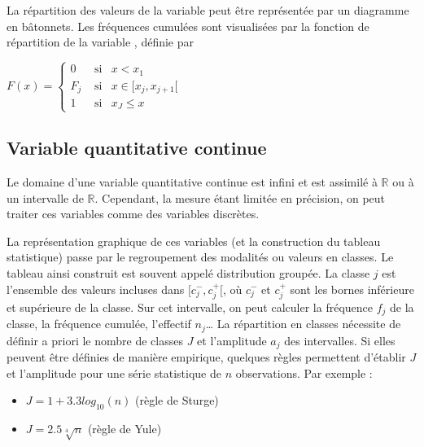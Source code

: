 \documentclass[letterpaper,10pt,english]{jupyterBook}
\begin{document}
\sphinxAtStartPar
La répartition des valeurs de la variable peut être représentée par un diagramme en bâtonnets. Les fréquences cumulées  sont visualisées par la fonction de répartition de la variable , définie par

\sphinxAtStartPar
\(F(x) = \left \{
\begin{eqnarray}
0&\textrm{ si} &x<x_1\\
F_j &\textrm{ si}&  x\in[x_j,x_{j+1}[\\
1& \textrm{ si}&  x_J\leq x
\end{eqnarray}\right .\)

\sphinxAtStartPar
{}


\subsection{Variable quantitative continue}
\label{\detokenize{statsdescriptives:variable-quantitative-continue}}
\ignorespaces 
\sphinxAtStartPar
Le domaine d’une  variable quantitative continue est infini et est assimilé à \(\mathbb{R}\) ou à un intervalle de \(\mathbb{R}\). Cependant, la mesure étant limitée en précision, on peut traiter ces variables comme des variables discrètes.

\sphinxAtStartPar
La représentation graphique de ces variables (et la construction du tableau statistique) passe par le regroupement des modalités ou valeurs en classes. Le tableau ainsi construit est souvent appelé distribution groupée. La classe \(j\) est l’ensemble des valeurs incluses dans \([c^-_j,c^+_j[\), où \(c^-_j\) et \(c^+_j\) sont les bornes inférieure et supérieure de la classe. Sur cet intervalle, on peut calculer la fréquence \(f_j\) de la classe, la fréquence cumulée, l’effectif \(n_j\)… La répartition en classes nécessite de définir a priori le nombre de classes \(J\) et l’amplitude \(a_j\) des intervalles. Si elles peuvent être définies de manière empirique, quelques règles permettent d’établir \(J\) et l’amplitude pour une série statistique de \(n\) observations. Par exemple :
\begin{itemize}
\item {} 
\sphinxAtStartPar
\(J=1+3.3log_{10}(n)\) (règle de Sturge)

\item {} 
\sphinxAtStartPar
\(J=2.5\sqrt[4\,]{n}\) (règle de Yule)

\end{itemize}
\end{document}
